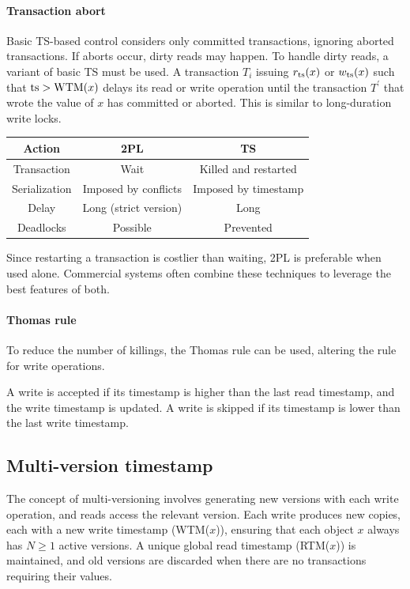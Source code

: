 \paragraph*{Transaction abort}
Basic TS-based control considers only committed transactions, ignoring aborted transactions. 
If aborts occur, dirty reads may happen. 
To handle dirty reads, a variant of basic TS must be used. 
A transaction $T_i$ issuing $r_{\textnormal{ts}}(x)$ or $w_{\textnormal{ts}}(x)$ such that $\textnormal{ts}>\textnormal{WTM}(x)$ delays its read or write operation until the transaction $T^{'}$ that wrote the value of $x$ has committed or aborted. 
This is similar to long-duration write locks.
\begin{table}[H]
    \centering
    \begin{tabular}{c|cc}
    \textbf{Action} & \textbf{2PL}          & \textbf{TS}          \\ \hline
    Transaction     & Wait                  & Killed and restarted \\
    Serialization   & Imposed by conflicts  & Imposed by timestamp \\
    Delay           & Long (strict version) & Long                 \\
    Deadlocks       & Possible              & Prevented           
    \end{tabular}
\end{table}
Since restarting a transaction is costlier than waiting, 2PL is preferable when used alone. 
Commercial systems often combine these techniques to leverage the best features of both. 

\paragraph*{Thomas rule}
To reduce the number of killings, the Thomas rule can be used, altering the rule for write operations. 

A write is accepted if its timestamp is higher than the last read timestamp, and the write timestamp is updated. 
A write is skipped if its timestamp is lower than the last write timestamp. 

\subsection{Multi-version timestamp}
The concept of multi-versioning involves generating new versions with each write operation, and reads access the relevant version.
Each write produces new copies, each with a new write timestamp (WTM($x$)), ensuring that each object $x$ always has $N \geq 1$ active versions.
A unique global read timestamp (RTM($x$)) is maintained, and old versions are discarded when there are no transactions requiring their values.

